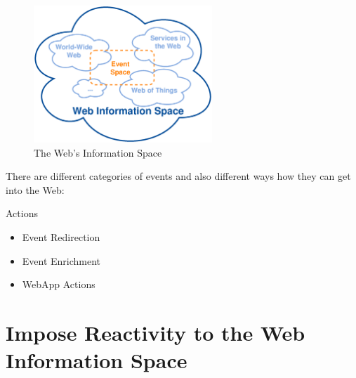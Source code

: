 \begin{figure}[!ht]
  \centering
  \includegraphics[width=0.6\textwidth]{figures/InformationSpace}
  \caption{The Web's Information Space}
  \label{fig:InformationSpace}
\end{figure}
There are different categories of events and also different ways how they can get into the Web:




Actions
\begin{itemize}
  \item Event Redirection
  \item Event Enrichment
  \item WebApp Actions
\end{itemize}


\section{Impose Reactivity to the Web Information Space}



